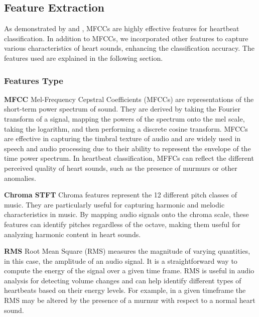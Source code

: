 \subsection{Feature Extraction}
As demonstrated by \cite{Raza_Mehmood_Ullah_Ahmad_Choi_On_2019} and \cite{Chen_Sun_Chen_Xie_Wu_Xu_2021}, MFCCs
are highly effective features for heartbeat classification. In addition to MFCCs,
we incorporated other features to capture various characteristics of heart sounds, enhancing the classification accuracy.
The features used are explained in the following section.

\subsubsection*{Features Type}  %
\textbf{MFCC}\newline
Mel-Frequency Cepstral Coefficients (MFCCs) are representations of the short-term power spectrum of sound.
They are derived by taking the Fourier transform of a signal, mapping the powers of the spectrum onto the mel
scale, taking the logarithm, and then performing a discrete cosine transform. MFCCs are effective in capturing
the timbral texture of audio and are widely used in speech and audio processing due to
their ability to represent the envelope of the time power spectrum.
In heartbeat classification, MFFCs can reflect the different perceived quality of heart sounds,
such as the presence of murmurs or other anomalies.

\vspace{0.3cm}\noindent
\textbf{Chroma STFT}\newline
Chroma features represent the 12 different pitch classes of music.
They are particularly useful for capturing harmonic and melodic characteristics in music.
By mapping audio signals onto the chroma scale, these features can identify pitches regardless
of the octave, making them useful for analyzing harmonic content in heart sounds.

\vspace{0.3cm}\noindent
\textbf{RMS}\newline
Root Mean Square (RMS) measures the magnitude of varying quantities, in this case,
the amplitude of an audio signal. It is a straightforward way to compute the energy of
the signal over a given time frame. RMS is useful in audio analysis for detecting volume
changes and can help identify different types of heartbeats based on their energy levels.
For example, in a given timeframe the RMS may be altered by the presence of a murmur
with respect to a normal heart sound.

